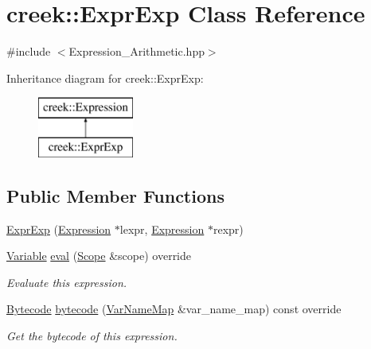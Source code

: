 \hypertarget{classcreek_1_1_expr_exp}{}\section{creek\+:\+:Expr\+Exp Class Reference}
\label{classcreek_1_1_expr_exp}


{\ttfamily \#include $<$Expression\+\_\+\+Arithmetic.\+hpp$>$}

Inheritance diagram for creek\+:\+:Expr\+Exp\+:\begin{figure}[H]
\begin{center}
\leavevmode
\includegraphics[height=2.000000cm]{classcreek_1_1_expr_exp}
\end{center}
\end{figure}
\subsection*{Public Member Functions}
\begin{DoxyCompactItemize}
\item 
\hyperlink{classcreek_1_1_expr_exp_aa7c64f13997a13c1cdd2ddf7b1f6ed7c}{Expr\+Exp} (\hyperlink{classcreek_1_1_expression}{Expression} $\ast$lexpr, \hyperlink{classcreek_1_1_expression}{Expression} $\ast$rexpr)
\item 
\hyperlink{classcreek_1_1_variable}{Variable} \hyperlink{classcreek_1_1_expr_exp_a705ec2846acdc2923f6c75e13ef5dd3a}{eval} (\hyperlink{classcreek_1_1_scope}{Scope} \&scope) override
\begin{DoxyCompactList}\small\item\em Evaluate this expression. \end{DoxyCompactList}\item 
\hyperlink{classcreek_1_1_bytecode}{Bytecode} \hyperlink{classcreek_1_1_expr_exp_a07505cfa48dd3c10437562d561944b4a}{bytecode} (\hyperlink{classcreek_1_1_var_name_map}{Var\+Name\+Map} \&var\+\_\+name\+\_\+map) const  override\hypertarget{classcreek_1_1_expr_exp_a07505cfa48dd3c10437562d561944b4a}{}\label{classcreek_1_1_expr_exp_a07505cfa48dd3c10437562d561944b4a}

\begin{DoxyCompactList}\small\item\em Get the bytecode of this expression. \end{DoxyCompactList}\end{DoxyCompactItemize}


